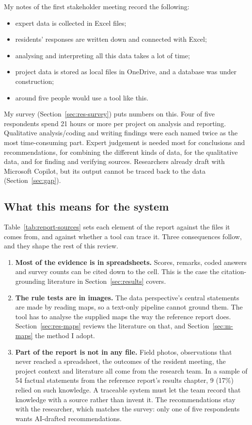 My notes of the first stakeholder meeting record the following:
\begin{itemize}
\item expert data is collected in Excel files;
\item residents' responses are written down and connected with Excel;
\item analysing and interpreting all this data takes a lot of time;
\item project data is stored as local files in OneDrive, and a database was under construction;
\item around five people would use a tool like this.
\end{itemize}
My survey (Section~\ref{sec:res-survey}) puts numbers on this. Four of five respondents spend 21 hours or more per project on analysis and reporting. Qualitative analysis/coding and writing findings were each named twice as the most time-consuming part. Expert judgement is needed most for conclusions and recommendations, for combining the different kinds of data, for the qualitative data, and for finding and verifying sources. Researchers already draft with Microsoft Copilot, but its output cannot be traced back to the data (Section~\ref{sec:gap}).

\subsection{What this means for the system}\label{sec:process-implications}

Table~\ref{tab:report-sources} sets each element of the report against the files it comes from, and against whether a tool can trace it. Three consequences follow, and they shape the rest of this review.
\begin{enumerate}
\item \textbf{Most of the evidence is in spreadsheets.} Scores, remarks, coded answers and survey counts can be cited down to the cell. This is the case the citation-grounding literature in Section~\ref{sec:results} covers.
\item \textbf{The rule tests are in images.} The data perspective's central statements are made by reading maps, so a text-only pipeline cannot ground them. The tool has to analyse the supplied maps the way the reference report does. Section~\ref{sec:res-maps} reviews the literature on that, and Section~\ref{sec:m-maps} the method I adopt.
\item \textbf{Part of the report is not in any file.} Field photos, observations that never reached a spreadsheet, the outcomes of the resident meeting, the project context and literature all come from the research team. In a sample of 54 factual statements from the reference report's results chapter, 9 (17\%) relied on such knowledge. A traceable system must let the team record that knowledge with a source rather than invent it. The recommendations stay with the researcher, which matches the survey: only one of five respondents wants AI-drafted recommendations.
\end{enumerate}

